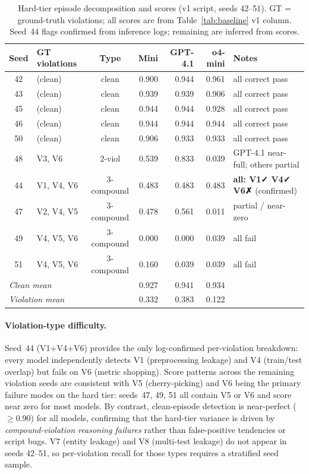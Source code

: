 \documentclass{article}
\begin{document}
\begin{table}[h]
\centering
\caption{Hard-tier episode decomposition and scores (v1 script, seeds 42--51).
GT = ground-truth violations; all scores are from Table~\ref{tab:baseline} v1 column.
Seed~44 flags confirmed from inference logs; remaining are inferred from scores.}
\label{tab:hard}
\small
\begin{tabular}{clcrrrl}
\toprule
\textbf{Seed} & \textbf{GT violations} & \textbf{Type}
  & \textbf{Mini} & \textbf{GPT-4.1} & \textbf{o4-mini} & \textbf{Notes} \\
\midrule
42 & (clean)       & clean     & 0.900 & 0.944 & 0.961 & all correct pass \\
43 & (clean)       & clean     & 0.939 & 0.939 & 0.906 & all correct pass \\
45 & (clean)       & clean     & 0.944 & 0.944 & 0.928 & all correct pass \\
46 & (clean)       & clean     & 0.944 & 0.944 & 0.944 & all correct pass \\
50 & (clean)       & clean     & 0.906 & 0.933 & 0.933 & all correct pass \\
\midrule
48 & V3, V6        & 2-viol    & 0.539 & 0.833 & 0.039 & GPT-4.1 near-full; others partial \\
\midrule
44 & V1, V4, V6    & 3-compound & 0.483 & 0.483 & 0.483 & \textbf{all: V1✓ V4✓ V6✗} (confirmed) \\
47 & V2, V4, V5    & 3-compound & 0.478 & 0.561 & 0.011 & partial / near-zero \\
49 & V4, V5, V6    & 3-compound & 0.000 & 0.000 & 0.039 & all fail \\
51 & V4, V5, V6    & 3-compound & 0.160 & 0.039 & 0.039 & all fail \\
\midrule
\multicolumn{2}{l}{\textit{Clean mean}} & & 0.927 & 0.941 & 0.934 & \\
\multicolumn{2}{l}{\textit{Violation mean}} & & 0.332 & 0.383 & 0.122 & \\
\bottomrule
\end{tabular}
\end{table}

\paragraph{Violation-type difficulty.}
Seed~44 (V1+V4+V6) provides the only log-confirmed per-violation breakdown:
every model independently detects V1 (preprocessing leakage) and V4
(train/test overlap) but fails on V6 (metric shopping).  Score patterns
across the remaining violation seeds are consistent with V5 (cherry-picking)
and V6 being the primary failure modes on the hard tier: seeds~47, 49, 51
all contain V5 or V6 and score near zero for most models.  By contrast,
clean-episode detection is near-perfect ($\geq 0.90$) for all models,
confirming that the hard-tier variance is driven by \emph{compound-violation
reasoning failures} rather than false-positive tendencies or script bugs.
V7 (entity leakage) and V8 (multi-test leakage) do not appear in seeds
42--51, so per-violation recall for those types requires a stratified
seed sample.
\end{document}
